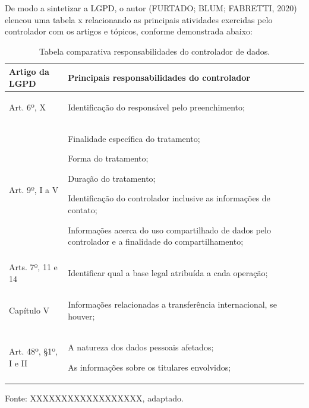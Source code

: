 \documentclass[
	12pt,				%
	openright,			%
	oneside,			%
	a4paper,			%
	english,			%
	french,				%
	spanish,			%
	brazil,				%
	]{abntex2}
\begin{document}
De modo a sintetizar a LGPD, o autor (FURTADO; BLUM; FABRETTI, 2020) elencou uma tabela  x relacionando as principais atividades exercidas pelo controlador com os artigos e tópicos, conforme demonstrada abaixo:

\begin{table}[ht]
    \centering
    \caption{Tabela comparativa responsabilidades do controlador de dados.}
    \label{tab: responsabilidades do controlador}
    \begin{tabular}{|p{4 cm}|p{11.5cm}|p{0cm}|} 
        \hline

        \textbf{Artigo da LGPD} & \textbf{Principais responsabilidades do controlador}  \\ \hline

Art. 6º, X
&
\begin{tabitemize}
\item Identificação do responsável pelo preenchimento;
\end{tabitemize}\\ \hline
Art. 9º, I a V
&
\begin{tabitemize}
\item Finalidade específica do tratamento;
\item Forma do tratamento;
\item Duração do tratamento;
\item Identificação do controlador inclusive as informações de contato;
\item Informações acerca do uso compartilhado de dados pelo controlador e a finalidade do compartilhamento;
\end{tabitemize} \\ \hline
Arts. 7º, 11 e 14
&
\begin{tabitemize}
\item Identificar qual a base legal atribuída a cada operação;
\end{tabitemize}\\ \hline

Capítulo V
&
\begin{tabitemize}
\item Informações relacionadas a transferência internacional, se houver;
\end{tabitemize}\\ \hline

Art. 48º, §1º, I e II
&
\begin{tabitemize}
\item A natureza dos dados pessoais afetados;
\item As informações sobre os titulares envolvidos;
\end{tabitemize}\\ \hline

 
    \end{tabular}
    \newline \newline Fonte: XXXXXXXXXXXXXXXXXX, adaptado.
\end{table}
\end{document}
